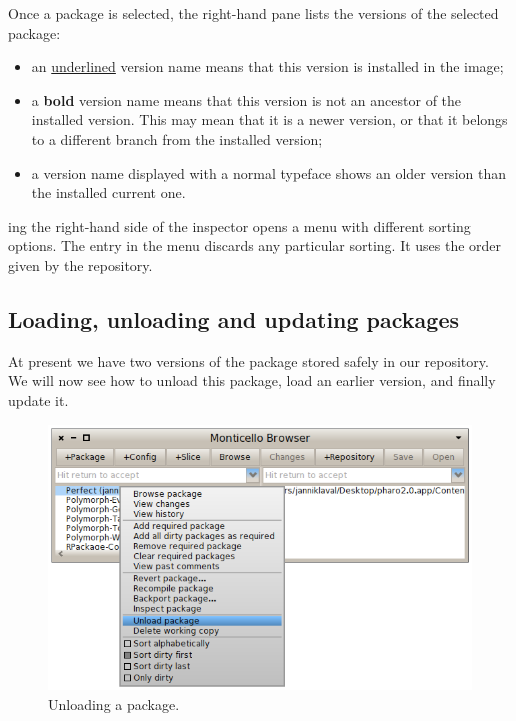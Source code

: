 \documentclass[a4paper,10pt,twoside]{book}
\begin{document}
\noindent
Once a package is selected, the right-hand pane lists the versions of the selected package:

\begin{itemize}
\item an \underline{underlined} version name means that this version is installed in the image;
\item a {\bf bold} version name means that this version is not an ancestor of the installed version. This may mean that it is a newer version, or that it belongs to a different branch from the installed version;
\item a version name displayed with a normal typeface shows an older version than the installed current one.
\end{itemize}

{\Actclick}ing the right-hand side of the inspector opens a menu with different sorting options. The  entry in the menu discards any particular sorting. It uses the order given by the repository.

\subsection{Loading, unloading and updating packages}

At present we have two versions of the  package stored safely in our  repository. We will now see how to unload this package, load an earlier version, and finally update it.


\begin{figure}[th]\centering
	\includegraphics[width=\textwidth]{unload}
	\caption{Unloading a package.}
\end{figure}
\end{document}
